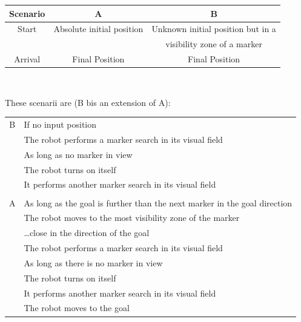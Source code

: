 \documentclass[10pt,a4paper]{article}
\begin{document}
\begin{center}
\begin{tabular} {c | c | c}
Scenario & A & B \\\hline
Start & Absolute initial position & Unknown initial position but in a \\
 & & visibility zone of a marker \\\hline
 Arrival & Final Position & Final Position
\end{tabular} \\
\end{center}

\noindent These scenarii are (B bis an extension of A): \\

\begin{tabular} {cl}
B & If no input position \\
  & \indent The robot performs a marker search in its visual field \\
  & \indent As long as no marker in view \\
  & \indent \indent The robot turns on itself \\
  & \indent \indent It performs another marker search in its visual field \\
& \\
A & As long as the goal is further than the next marker in the goal direction \\
  & \indent The robot moves to the most visibility zone of the marker \\
  & \indent \ldots close in the direction of the goal \\
  & \indent The robot performs a marker search in its visual field \\
  & \indent As long as there is no marker in view \\
  & \indent \indent The robot turns on itself \\
  & \indent \indent It performs another marker search in its visual field \\
  & \indent The robot moves to the goal \\
\end{tabular}
\end{document}
